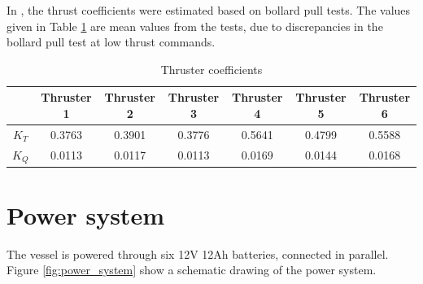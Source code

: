 In \cite{frederich2016constrained}, the thrust coefficients were estimated based on bollard pull tests. The values given in Table \ref{tab:thruster_coefficients} are mean values from the tests, due to discrepancies in the bollard pull test at low thrust commands. 
\begin{table}[htb!]
	\centering
	\caption{Thruster coefficients}
	\label{tab:thruster_coefficients}
	\begin{tabular}{ccccccc}
		\hline
		 & \textbf{Thruster 1} & \textbf{Thruster 2} & \textbf{Thruster 3} & \textbf{Thruster 4} & \textbf{Thruster 5} & \textbf{Thruster 6}\\ \hline
		$K_T$ & 0.3763 & 0.3901 & 0.3776 & 0.5641 & 0.4799 & 0.5588\\
		$K_Q$ & 0.0113 & 0.0117 & 0.0113 & 0.0169 & 0.0144 & 0.0168\\ \hline
	\end{tabular}
\end{table}

\section{Power system}
The vessel is powered through six 12V 12Ah batteries, connected in parallel. Figure \ref{fig:power_system} show a schematic drawing of the power system.

